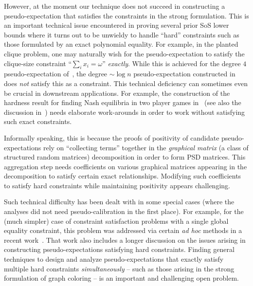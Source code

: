 \documentclass[10pt,a4paper]{article}
\theoremstyle{definition}
\begin{document}
However, at the moment our technique does not succeed in constructing a pseudo-expectation that satisfies the constraints in the strong formulation. This is an important technical issue encountered in proving several prior SoS lower bounds where it turns out to be unwieldy to handle ``hard'' constraints such as those formulated by an exact polynomial equality. For example, in the planted clique problem, one may naturally wish for the pseudo-expectation to satisfy the clique-size constraint ``$\sum_i x_i = \omega$'' \emph{exactly}. While this is achieved for the degree $4$ pseudo-expectation of~\cite{DBLP:journals/corr/HopkinsKP15,DBLP:journals/corr/RaghavendraS15}, the degree $\sim \log n$ pseudo-expectation constructed in~\cite{DBLP:conf/focs/BarakHKKMP16} does \emph{not} satisfy this as a constraint. This technical deficiency can sometimes even be crucial in downstream applications. For example, the construction of the hardness result for finding Nash equilibria in two player games in~\cite{DBLP:conf/stoc/KothariM18} (see also the discussion in~\cite{DBLP:journals/corr/abs-1809-01207}) needs elaborate work-arounds in order to work without satisfying such exact constraints. 

Informally speaking, this is because the proofs of positivity of candidate pseudo-expectations rely on ``collecting terms'' together in the \emph{graphical matrix} (a class of structured random matrices) decomposition in order to form PSD matrices. This aggregation step needs coefficients on various graphical matrices appearing in the decomposition to satisfy certain exact relationships. Modifying such coefficients to satisfy hard constraints while maintaining positivity appears challenging. 

Such technical difficulty has been dealt with in some special cases (where the analyses did not need pseudo-calibration in the first place). For example, for the (much simpler) case of constraint satisfaction problems with a single global equality constraint, this problem was addressed via certain \emph{ad hoc} methods in a recent work~\cite{DBLP:journals/corr/abs-1809-01207}. That work also includes a longer discussion on the issues arising in constructing pseudo-expectations satisfying hard constraints. Finding general techniques to design and analyze pseudo-expectations that exactly satisfy multiple hard constraints \emph{simultaneously} -- such as those arising in the strong formulation of graph coloring -- is an important and challenging open problem. 
\end{document}
